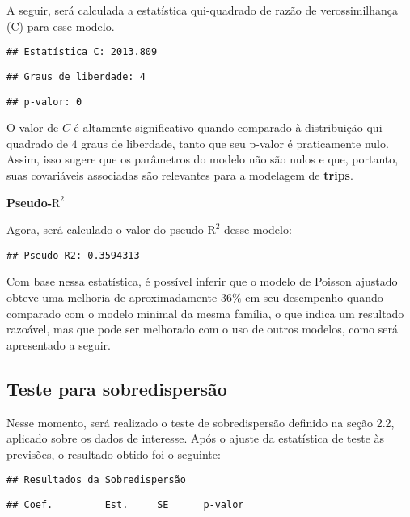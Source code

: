 \documentclass[
  twocolumn]{article}
\begin{document}
A seguir, será calculada a estatística qui-quadrado de razão de
verossimilhança (C) para esse modelo.

\begin{verbatim}
## Estatística C: 2013.809
\end{verbatim}

\begin{verbatim}
## Graus de liberdade: 4
\end{verbatim}

\begin{verbatim}
## p-valor: 0
\end{verbatim}

O valor de \(C\) é altamente significativo quando comparado à
distribuição qui-quadrado de \(4\) graus de liberdade, tanto que seu
p-valor é praticamente nulo. Assim, isso sugere que os parâmetros do
modelo não são nulos e que, portanto, suas covariáveis associadas são
relevantes para a modelagem de \textbf{trips}.

\textbf{Pseudo-\(\text{R}^2\)}

Agora, será calculado o valor do pseudo-\(\text{R}^2\) desse modelo:

\begin{verbatim}
## Pseudo-R2: 0.3594313
\end{verbatim}

Com base nessa estatística, é possível inferir que o modelo de Poisson
ajustado obteve uma melhoria de aproximadamente \(36\%\) em seu
desempenho quando comparado com o modelo minimal da mesma família, o que
indica um resultado razoável, mas que pode ser melhorado com o uso de
outros modelos, como será apresentado a seguir.

\subsection{Teste para
sobredispersão}\label{teste-para-sobredispersuxe3o}

Nesse momento, será realizado o teste de sobredispersão definido na
seção 2.2, aplicado sobre os dados de interesse. Após o ajuste da
estatística de teste às previsões, o resultado obtido foi o seguinte:

\begin{verbatim}
## Resultados da Sobredispersão
\end{verbatim}

\begin{verbatim}
## Coef.         Est.     SE      p-valor
\end{verbatim}
\end{document}
